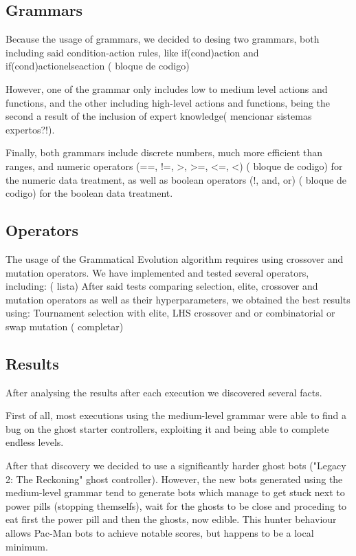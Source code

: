 \documentclass{llncs}
\begin{document}
\subsection{Grammars}
Because the usage of grammars, we decided to desing two grammars, both including said condition-action rules, like if(cond){action} and if(cond){action}else{action} ({\color{red} bloque de codigo})

However, one of the grammar only includes low to medium level actions and functions, and the other including high-level actions and functions, being the second a result of the inclusion of expert knowledge({\color{red} mencionar sistemas expertos?!}).

Finally, both grammars include discrete numbers, much more efficient than ranges, and numeric operators (==, !=, >, >=, <=, <) ({\color{red} bloque de codigo}) for the numeric data treatment, as well as boolean operators (!, and, or) ({\color{red} bloque de codigo}) for the boolean data treatment.

\subsection{Operators}
The usage of the Grammatical Evolution algorithm requires using crossover and mutation operators. We have implemented and tested several operators, including: ({\color{red} lista})
After said tests comparing selection, elite, crossover and mutation operators as well as their hyperparameters, we obtained the best results using: Tournament selection with elite, LHS crossover and or combinatorial or swap mutation ({\color{red} completar})

\subsection{Results}
After analysing the results after each execution we discovered several facts. 

First of all, most executions using the medium-level grammar were able to find a bug on the ghost starter controllers, exploiting it and being able to complete endless levels.

After that discovery we decided to use a significantly harder ghost bots ("Legacy 2: The Reckoning" ghost controller). However, the new bots generated using the medium-level grammar tend to generate bots which manage to get stuck next to power pills (stopping themselfs), wait for the ghosts to be close and proceding to eat first the power pill and then the ghosts, now edible. This hunter behaviour allows Pac-Man bots to achieve notable scores, but happens to be a local minimum.
\end{document}
